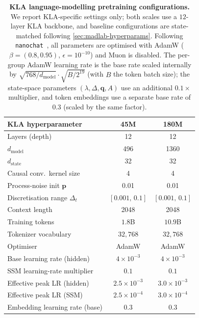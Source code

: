 \documentclass{article}
\newcommand{\our}{\textsc{KLA}\xspace}
\begin{document}
\begin{table}[h]
\caption{\textbf{\our{} language-modelling pretraining configurations.} We report
\our-specific settings only; both scales use a $12$-layer \our{} backbone, and
baseline configurations are state-matched following \cref{sec:madlab-hyperparams}.
Following \texttt{nanochat}~\citep{nanochat}, all parameters are optimised with
AdamW ($\beta=(0.8,0.95)$, $\epsilon=10^{-10}$) and Muon is disabled. The
per-group AdamW learning rate is the base rate scaled internally by
$\sqrt{768/d_{\text{model}}}\cdot\sqrt{B/2^{19}}$ (with $B$ the token batch size);
the state-space parameters $(\lambda,\Delta,\mathbf{q},A)$ use an additional
$0.1\times$ multiplier, and token embeddings use a separate base rate of $0.3$
(scaled by the same factor).}
\label{tab:lm-pretrain-hparams}
\centering
\small
\setlength{\tabcolsep}{8pt}
\renewcommand{\arraystretch}{1.12}
\begin{tabular}{lcc}
\toprule
\textbf{\our{} hyperparameter} & \textbf{45M} & \textbf{180M} \\
\midrule
Layers (depth)                       & 12 & 12 \\
$d_{\text{model}}$                   & 496 & 1360 \\
$d_{\text{state}}$                   & 32 & 32 \\
Causal conv.\ kernel size            & 4 & 4 \\
Process-noise init $\mathbf{p}$      & 0.01 & 0.01 \\
Discretisation range $\Delta_t$      & $[0.001,\,0.1]$ & $[0.001,\,0.1]$ \\
Context length                       & 2048 & 2048 \\
Training tokens                      & $1.8$B & $10.9$B \\
Tokenizer vocabulary                 & $32{,}768$ & $32{,}768$ \\
\midrule
Optimiser                            & AdamW & AdamW \\
Base learning rate (hidden)          & $4\times10^{-3}$ & $4\times10^{-3}$ \\
SSM learning-rate multiplier         & $0.1$ & $0.1$ \\
Effective peak LR (hidden)           & $2.5\times10^{-3}$ & $3.0\times10^{-3}$ \\
Effective peak LR (SSM)              & $2.5\times10^{-4}$ & $3.0\times10^{-4}$ \\
Embedding learning rate (base)       & $0.3$ & $0.3$ \\

\end{tabular}
\end{table}
\end{document}
